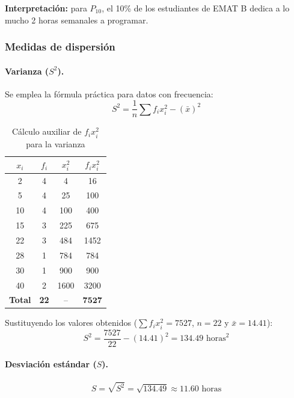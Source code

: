 \documentclass[12pt,letterpaper]{article}
\begin{document}
\noindent\textbf{Interpretación:} para $P_{10}$, el 10\% de los estudiantes de EMAT B dedica a lo mucho 2 horas semanales a programar.

\subsubsection{Medidas de dispersión}

\paragraph{Varianza ($S^2$).}
Se emplea la fórmula práctica para datos con frecuencia:
$$S^2 = \frac{1}{n} \sum f_i x_i^2 - (\bar{x})^2$$

\begin{table}[H]
    \centering
    \caption{Cálculo auxiliar de $f_i x_i^2$ para la varianza}
    \vspace{1em}
    \label{tab:aux-varianza}
    \begin{tabular}{@{}cccc@{}}
        \toprule
        $x_i$ & $f_i$ & $x_i^2$ & $f_i x_i^2$ \\
        \midrule
        2  & 4 & 4    & 16 \\
        5  & 4 & 25   & 100 \\
        10 & 4 & 100  & 400 \\
        15 & 3 & 225  & 675 \\
        22 & 3 & 484  & 1452 \\
        28 & 1 & 784  & 784 \\
        30 & 1 & 900  & 900 \\
        40 & 2 & 1600 & 3200 \\
        \midrule
        \textbf{Total} & \textbf{22} & -- & $\mathbf{7527}$ \\
        \bottomrule
    \end{tabular}
\end{table}

\noindent Sustituyendo los valores obtenidos ($\sum f_i x_i^2 = 7527$, $n = 22$ y $\bar{x} = 14.41$):
$$S^2 = \frac{7527}{22} - (14.41)^2 = 134.49 \text{ horas}^2$$

\paragraph{Desviación estándar ($S$).}
$$S = \sqrt{S^2} = \sqrt{134.49} \approx 11.60 \text{ horas}$$
\end{document}
